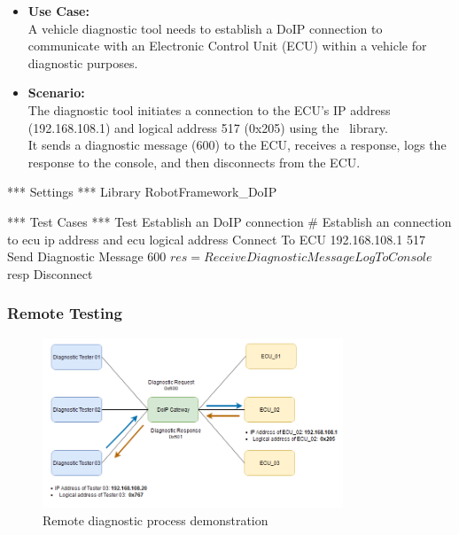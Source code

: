             \begin{itemize}
                \item\textbf{Use Case:}\\
                    A vehicle diagnostic tool needs to establish a DoIP connection to communicate with an Electronic Control Unit (ECU)
                    within a vehicle for diagnostic purposes.

                \item\textbf{Scenario:} \\
                    The diagnostic tool initiates a connection to the ECU's IP address (192.168.108.1) and logical address 517 (0x205) using 
                    the \pkg\ library. \\
                    It sends a diagnostic message (600) to the ECU, receives a response, logs the response 
                    to the console, and then disconnects from the ECU.
            \end{itemize}

        \begin{robotcode}
*** Settings ***
Library    RobotFramework_DoIP

*** Test Cases ***
Test Establish an DoIP connection
    # Establish an connection to ecu ip address and ecu logical address
    Connect To ECU     192.168.108.1      517
    Send Diagnostic Message     600
    ${res}= Receive Diagnostic Message
    Log To Console    ${resp}
    Disconnect
        \end{robotcode}

        \subsubsection{Remote Testing}
            \begin{figure}[htbp]
                \centering
                \includegraphics[width=0.8\textwidth]{./pictures/demo-remote-diagnostic.png}
                \caption{Remote diagnostic process demonstration}
                \label{fig:2.3}
            \end{figure}

